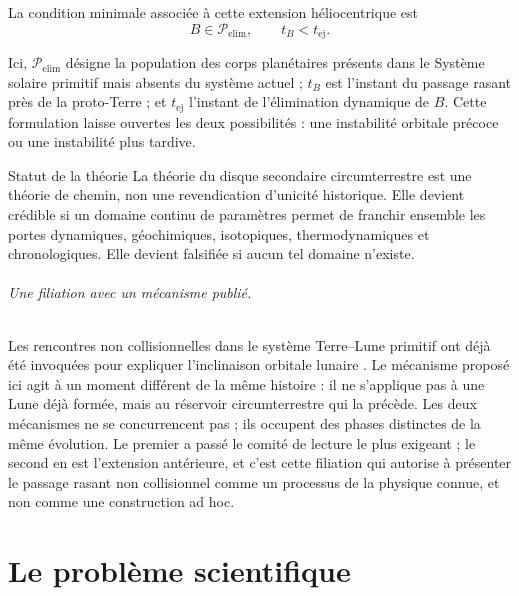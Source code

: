 \documentclass[11pt,a4paper,openany]{report}
\begin{document}
La condition minimale associée à cette extension héliocentrique est
\begin{equation}
\boxed{
B\in\mathcal{P}_{\mathrm{elim}},
\qquad
 t_B<t_{\mathrm{ej}} .
}
\label{eq:B-elim-preambule}
\end{equation}

Ici, $\mathcal{P}_{\mathrm{elim}}$ désigne la population des corps planétaires
présents dans le Système solaire primitif mais absents du système actuel ;
$t_B$ est l'instant du passage rasant près de la proto-Terre ; et
$t_{\mathrm{ej}}$ l'instant de l'élimination dynamique de $B$. Cette formulation
laisse ouvertes les deux possibilités : une instabilité orbitale précoce ou une
instabilité plus tardive.

\begin{principe}{Statut de la théorie}
La théorie du disque secondaire circumterrestre est une théorie de chemin, non
une revendication d'unicité historique. Elle devient crédible si un domaine
continu de paramètres permet de franchir ensemble les portes dynamiques,
géochimiques, isotopiques, thermodynamiques et chronologiques. Elle devient
falsifiée si aucun tel domaine n'existe.
\end{principe}

\paragraph{Une filiation avec un mécanisme publié.}
Les rencontres non collisionnelles dans le système Terre--Lune primitif ont déjà
été invoquées pour expliquer l'inclinaison orbitale lunaire
\cite{PahlevanMorbidelli2015}. Le mécanisme proposé ici agit à un moment
différent de la même histoire : il ne s'applique pas à une Lune déjà formée, mais
au réservoir circumterrestre qui la précède. Les deux mécanismes ne se
concurrencent pas ; ils occupent des phases distinctes de la même évolution. Le
premier a passé le comité de lecture le plus exigeant ; le second en est
l'extension antérieure, et c'est cette filiation qui autorise à présenter le
passage rasant non collisionnel comme un processus de la physique connue, et non
comme une construction ad hoc.

\clearpage
{}
\part{Le problème scientifique}
\end{document}
